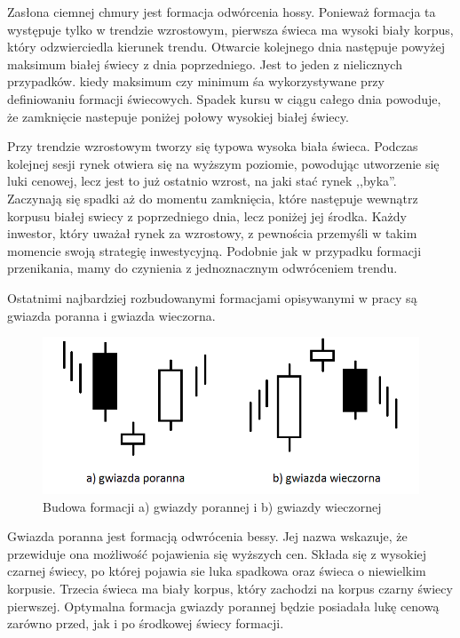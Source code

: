 \documentclass[pdflatex,11pt]{aghdpl}
\begin{document}
Zasłona ciemnej chmury jest formacja odwórcenia hossy. Ponieważ formacja ta występuje tylko w trendzie wzrostowym, pierwsza świeca ma wysoki biały korpus, który odzwierciedla kierunek trendu. Otwarcie kolejnego dnia następuje powyżej maksimum białej świecy z dnia poprzedniego. Jest to jeden z nielicznych przypadków. kiedy maksimum czy minimum śa wykorzystywane przy definiowaniu formacji świecowych. Spadek kursu w ciągu całego dnia powoduje, że zamknięcie nastepuje poniżej połowy wysokiej białej świecy. 

Przy trendzie wzrostowym tworzy się typowa wysoka biała świeca. Podczas kolejnej sesji rynek otwiera się na wyższym poziomie, powodując utworzenie się luki cenowej, lecz jest to już ostatnio wzrost, na jaki stać rynek ,,byka''. Zaczynają się spadki aż do momentu zamknięcia, które następuje wewnątrz korpusu białej swiecy z poprzedniego dnia, lecz poniżej jej środka. Każdy inwestor, który uważał rynek za wzrostowy, z pewnościa przemyśli w takim momencie swoją strategię inwestycyjną. Podobnie jak w przypadku formacji przenikania, mamy do czynienia z jednoznacznym odwróceniem trendu.
 
Ostatnimi najbardziej rozbudowanymi formacjami opisywanymi w pracy są gwiazda poranna i gwiazda wieczorna. 
\begin{figure}[ht]
\begin{center}
\includegraphics[width=12cm]{stars.png}
\caption{Budowa formacji a) gwiazdy porannej i b) gwiazdy wieczornej}
\label{gwiazdy}
\end{center}
\end{figure} 

Gwiazda poranna jest formacją odwrócenia bessy. Jej nazwa wskazuje, że przewiduje ona możliwość pojawienia się wyższych cen. Składa się z wysokiej czarnej świecy, po której pojawia sie luka spadkowa oraz świeca o niewielkim korpusie. Trzecia świeca ma biały korpus, który zachodzi na korpus czarny świecy pierwszej. Optymalna formacja gwiazdy porannej będzie posiadała lukę cenową zarówno przed, jak i po środkowej świecy formacji.
\end{document}

